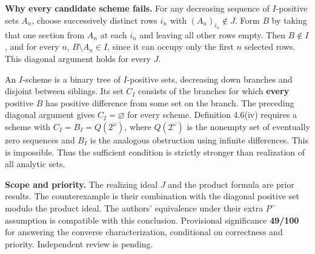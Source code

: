 \documentclass[11pt]{article}
\begin{document}
\textbf{Why every candidate scheme fails.} For any decreasing sequence of \(I\)-positive sets \(A_n\), choose successively distinct rows \(i_n\) with \((A_n)_{i_n}\notin J\). Form \(B\) by taking that one section from \(A_n\) at each \(i_n\) and leaving all other rows empty. Then \(B\notin I\), and for every \(n\), \(B\setminus A_n\in I\), since it can occupy only the first \(n\) selected rows. This diagonal argument holds for every \(J\).

An \(I\)-scheme is a binary tree of \(I\)-positive sets, decreasing down branches and disjoint between siblings. Its set \(C_I\) consists of the branches for which \textbf{every} positive \(B\) has positive difference from some set on the branch. The preceding diagonal argument gives \(C_I=\varnothing\) for every scheme. Definition 4.6(iv) requires a scheme with \(C_I=B_I=Q(2^\omega)\), where \(Q(2^\omega)\) is the nonempty set of eventually zero sequences and \(B_I\) is the analogous obstruction using infinite differences. This is impossible. Thus the sufficient condition is strictly stronger than realization of all analytic sets.

\textbf{Scope and priority.} The realizing ideal \(J\) and the product formula are prior results. The counterexample is their combination with the diagonal positive set modulo the product ideal. The authors' equivalence under their extra \(P^{-}\) assumption is compatible with this conclusion. Provisional significance \textbf{49/100} for answering the converse characterization, conditional on correctness and priority. Independent review is pending.
\end{document}
